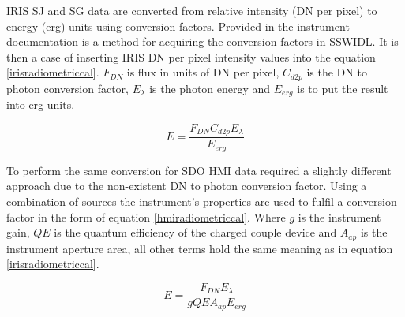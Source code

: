 







IRIS SJ and SG data are converted from relative intensity (DN per pixel) to energy (erg) units using conversion factors. Provided in the instrument documentation \citep{2014SoPh..289.2733D} is a method for acquiring the conversion factors in SSWIDL. It is then a case of inserting IRIS DN per pixel intensity values into the equation \ref{irisradiometriccal}. $F_{DN}$ is flux in units of DN per pixel, $C_{d2p}$ is the DN to photon conversion factor, $E_{\lambda}$ is the photon energy and $E_{erg}$ is to put the result into erg units.  

\begin{equation}\label{irisradiometriccal}
E = \frac{F_{DN}  C_{d2p} E_{\lambda}}{E_{erg}}
\end{equation}

To perform the same conversion for SDO HMI data required a slightly different approach due to the non-existent DN to photon conversion factor. Using a combination of sources \citep{2012SoPh..275...41B, 2012SoPh..275..285C} the instrument's properties are used to fulfil a conversion factor in the form of equation \ref{hmiradiometriccal}. Where $g$ is the instrument gain, $QE$ is the quantum efficiency of the charged couple device and $A_{ap}$ is the instrument aperture area, all other terms hold the same meaning as in equation \ref{irisradiometriccal}.

\begin{equation}\label{hmiradiometriccal}
E = \frac{F_{DN} E_{\lambda}}{g QE A_{ap} E_{erg}}
\end{equation}


